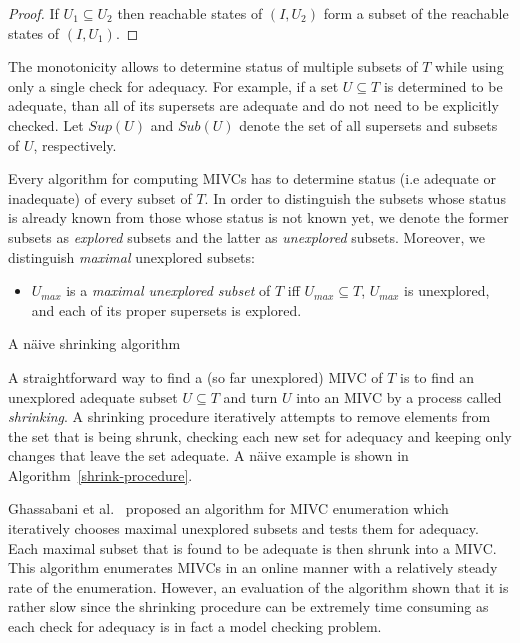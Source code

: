 \vspace{-15pt}
\begin{proof}
If $U_1 \subseteq U_2$ then reachable states of $(I, U_2)$ form  a subset of the reachable states
of $(I, U_1)$.
\end{proof}


\vspace{-5pt}
The monotonicity allows  to determine status  of multiple subsets of $T$ while using only a single check for adequacy. For example, if a set $U \subseteq T$ is determined to be adequate, than all of its supersets are   adequate and do not need to be explicitly checked. Let     $\mathit{Sup}(U)$ and $\mathit{Sub}(U)$ denote the set of all supersets and subsets of $U$, respectively.

Every algorithm for computing MIVCs has to determine status (i.e adequate or inadequate) of every subset of $T$.  In order to distinguish the subsets whose status is already known from those whose status is not known yet, we denote the former subsets as \emph{explored} subsets and the latter as \emph{unexplored} subsets. Moreover, we distinguish \emph{maximal} unexplored subsets:

\vspace{-5pt}
\begin{itemize}
	\item $U_{max}$ is a \emph{maximal unexplored subset} of $T$ iff $U_{max} \subseteq T$, $U_{max}$ is unexplored, and each of its proper supersets is explored.
\end{itemize}
\vspace{-5pt}


\begin{algorithm}[!t]
\begin{small}

\caption{A n\"aive shrinking algorithm }
\label{shrink-procedure}
\end{small}
\end{algorithm}


A straightforward way to find a (so far unexplored) MIVC of $T$ is to find an unexplored adequate subset $U \subseteq T$ and turn $U$  into an MIVC by a process called \emph{shrinking}.  A shrinking procedure iteratively attempts to remove elements from the set that is being shrunk, checking each new set for adequacy and keeping only changes that
leave the set adequate. A n\"aive example is shown in Algorithm~\ref{shrink-procedure}.

Ghassabani et al.~\cite{Ghass17AllIVCs} proposed an algorithm for MIVC enumeration which iteratively chooses maximal unexplored subsets and tests them for adequacy. Each maximal subset that is found to be adequate is then shrunk into a MIVC. This algorithm enumerates MIVCs in an online manner with a relatively steady rate of the enumeration. However, an evaluation of the algorithm shown that it is rather slow since the shrinking procedure can be extremely time consuming as each check for adequacy is in fact a model checking problem.

